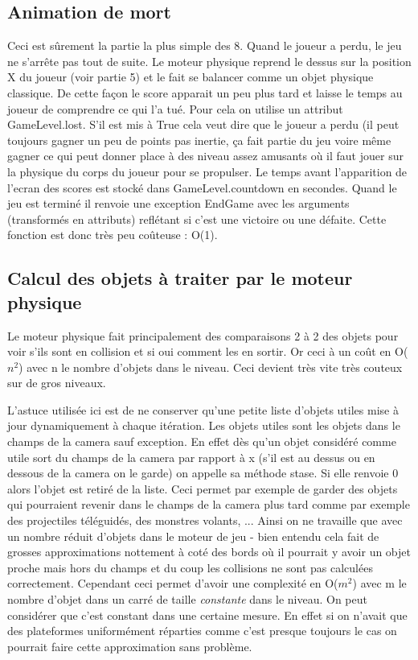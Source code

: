 \documentclass[11pt]{article}
\begin{document}
\subsection{Animation de mort}
Ceci est sûrement la partie la plus simple des 8. Quand le joueur a perdu, le jeu ne s'arrête pas tout de suite. Le moteur physique reprend le dessus sur la position X du joueur (voir partie 5) et le fait se balancer comme un objet physique classique. De cette façon le score apparait un peu plus tard et laisse le temps au joueur de comprendre ce qui l'a tué. Pour cela on utilise un attribut GameLevel.lost. S'il est mis à True cela veut dire que le joueur a perdu (il peut toujours gagner un peu de points pas inertie, ça fait partie du jeu voire même gagner ce qui peut donner place à des niveau assez amusants où il faut jouer sur la physique du corps du joueur pour se propulser. Le temps avant l'apparition de l'ecran des scores est stocké dans GameLevel.countdown en secondes. Quand le jeu est terminé il renvoie une exception EndGame avec les arguments (transformés en attributs) reflétant si c'est une victoire ou une défaite. Cette fonction est donc très peu coûteuse : O(1).


\subsection{Calcul des objets à traiter par le moteur physique}
Le moteur physique fait principalement des comparaisons 2 à 2 des objets pour voir s'ils sont en collision et si oui comment les en sortir. Or ceci à un coût en O($n^2$) avec n le nombre d'objets dans le niveau. Ceci devient très vite très couteux sur de gros niveaux. 

L'astuce utilisée ici est de ne conserver qu'une petite liste d'objets utiles mise à jour dynamiquement à chaque itération. Les objets utiles sont les objets dans le champs de la camera sauf exception. En effet dès qu'un objet considéré comme utile sort du champs de la camera par rapport à x (s'il est au dessus ou en dessous de la camera on le garde) on appelle sa méthode stase. Si elle renvoie 0 alors l'objet est retiré de la liste. Ceci permet par exemple de garder des objets qui pourraient revenir dans le champs de la camera plus tard comme par exemple des projectiles téléguidés, des monstres volants, ... Ainsi on ne travaille que avec un nombre réduit d'objets dans le moteur de jeu - bien entendu cela fait de grosses approximations nottement à coté des bords où il pourrait y avoir un objet proche mais hors du champs et du coup les collisions ne sont pas calculées correctement. Cependant ceci permet d'avoir une complexité en O($m^2$) avec m le nombre d'objet dans un carré de taille \emph{constante} dans le niveau. On peut considérer que c'est constant dans une certaine mesure. En effet si on n'avait que des plateformes uniformément réparties comme c'est presque toujours le cas on pourrait faire cette approximation sans problème.
\end{document}
